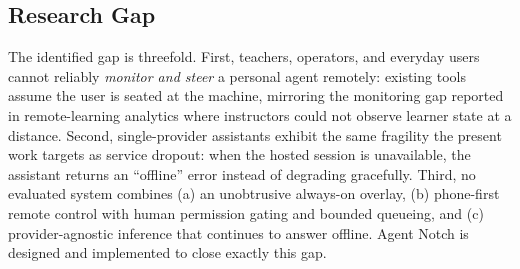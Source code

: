 \documentclass[conference]{IEEEtran}
\begin{document}
\subsection{Research Gap}

The identified gap is threefold. First, teachers, operators, and
everyday users cannot reliably \emph{monitor and steer} a
personal agent remotely: existing tools assume the user is
seated at the machine, mirroring the monitoring gap reported in
remote-learning analytics where instructors could not observe
learner state at a distance. Second, single-provider assistants
exhibit the same fragility the present work targets as service
dropout: when the hosted session is unavailable, the assistant
returns an ``offline'' error instead of degrading gracefully.
Third, no evaluated system combines (a) an unobtrusive
always-on overlay, (b) phone-first remote control with human
permission gating and bounded queueing, and (c)
provider-agnostic inference that continues to answer offline.
Agent Notch is designed and implemented to close exactly this
gap.
\end{document}
